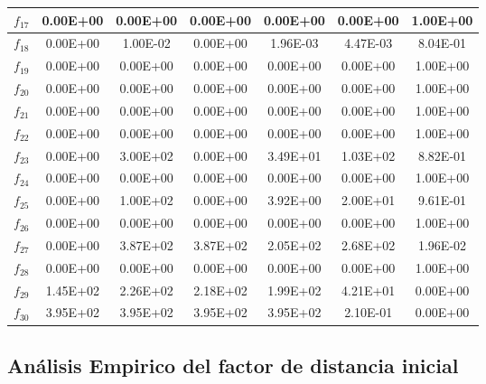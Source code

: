 \begin{table}[!t]
\begin{scriptsize}
\begin{tabular}{|c|c|c|c|c|c|c|}
$f_{17}$ & 0.00E+00 & 0.00E+00 & 0.00E+00 & 0.00E+00 & 0.00E+00 & 1.00E+00 \\ \hline
$f_{18}$ & 0.00E+00 & 1.00E-02 & 0.00E+00 & 1.96E-03 & 4.47E-03 & 8.04E-01 \\ \hline
$f_{19}$ & 0.00E+00 & 0.00E+00 & 0.00E+00 & 0.00E+00 & 0.00E+00 & 1.00E+00 \\ \hline
$f_{20}$ & 0.00E+00 & 0.00E+00 & 0.00E+00 & 0.00E+00 & 0.00E+00 & 1.00E+00 \\ \hline
$f_{21}$ & 0.00E+00 & 0.00E+00 & 0.00E+00 & 0.00E+00 & 0.00E+00 & 1.00E+00 \\ \hline
$f_{22}$ & 0.00E+00 & 0.00E+00 & 0.00E+00 & 0.00E+00 & 0.00E+00 & 1.00E+00 \\ \hline
$f_{23}$ & 0.00E+00 & 3.00E+02 & 0.00E+00 & 3.49E+01 & 1.03E+02 & 8.82E-01 \\ \hline
$f_{24}$ & 0.00E+00 & 0.00E+00 & 0.00E+00 & 0.00E+00 & 0.00E+00 & 1.00E+00 \\ \hline
$f_{25}$ & 0.00E+00 & 1.00E+02 & 0.00E+00 & 3.92E+00 & 2.00E+01 & 9.61E-01 \\ \hline
$f_{26}$ & 0.00E+00 & 0.00E+00 & 0.00E+00 & 0.00E+00 & 0.00E+00 & 1.00E+00 \\ \hline
$f_{27}$ & 0.00E+00 & 3.87E+02 & 3.87E+02 & 2.05E+02 & 2.68E+02 & 1.96E-02 \\ \hline
$f_{28}$ & 0.00E+00 & 0.00E+00 & 0.00E+00 & 0.00E+00 & 0.00E+00 & 1.00E+00 \\ \hline
$f_{29}$ & 1.45E+02 & 2.26E+02 & 2.18E+02 & 1.99E+02 & 4.21E+01 & 0.00E+00 \\ \hline
$f_{30}$ & 3.95E+02 & 3.95E+02 & 3.95E+02 & 3.95E+02 & 2.10E-01 & 0.00E+00 \\ \hline
\end{tabular}%
\end{scriptsize}
\end{table}

\subsection{Análisis Empirico del factor de distancia inicial}

